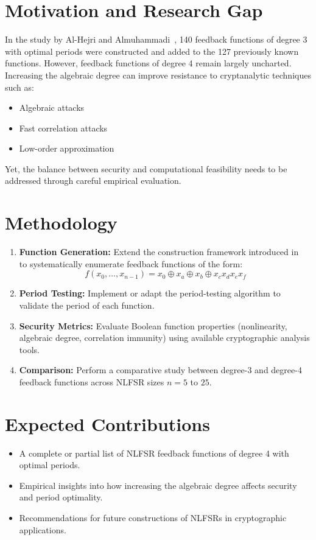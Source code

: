 \documentclass[11pt]{article}
\begin{document}
\section{Motivation and Research Gap}
In the study by Al-Hejri and Almuhammadi~\cite{hejri2019nlfsr}, 140 feedback functions of degree 3 with optimal periods were constructed and added to the 127 previously known functions. However, feedback functions of degree 4 remain largely uncharted. Increasing the algebraic degree can improve resistance to cryptanalytic techniques such as:
\begin{itemize}
    \item Algebraic attacks
    \item Fast correlation attacks
    \item Low-order approximation
\end{itemize}
Yet, the balance between security and computational feasibility needs to be addressed through careful empirical evaluation.

\section{Methodology}
\begin{enumerate}[label=\arabic*.]
    \item \textbf{Function Generation:} Extend the construction framework introduced in~\cite{almuhammadi2018nlfsr} to systematically enumerate feedback functions of the form:
    \[
    f(x_0, \ldots, x_{n-1}) = x_0 \oplus x_a \oplus x_b \oplus x_c x_d x_e x_f
    \]
    \item \textbf{Period Testing:} Implement or adapt the period-testing algorithm to validate the period of each function.
    \item \textbf{Security Metrics:} Evaluate Boolean function properties (nonlinearity, algebraic degree, correlation immunity) using available cryptographic analysis tools.
    \item \textbf{Comparison:} Perform a comparative study between degree-3 and degree-4 feedback functions across NLFSR sizes $n = 5$ to $25$.
\end{enumerate}

\section{Expected Contributions}
\begin{itemize}
    \item A complete or partial list of NLFSR feedback functions of degree 4 with optimal periods.
    \item Empirical insights into how increasing the algebraic degree affects security and period optimality.
    \item Recommendations for future constructions of NLFSRs in cryptographic applications.
\end{itemize}
\end{document}

